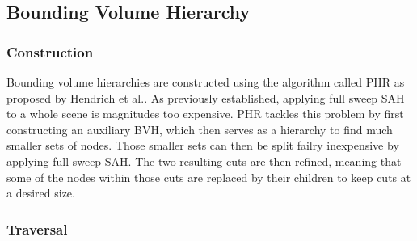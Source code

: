 \subsection{Bounding Volume Hierarchy}
\subsubsection{Construction}
Bounding volume hierarchies are constructed using the algorithm called PHR as proposed by Hendrich et al.\cite{hendrich_parallel_2017}. As previously established, applying full sweep SAH to a whole scene is magnitudes too expensive. PHR tackles this problem by first constructing an auxiliary BVH, which then serves as a hierarchy to find much smaller sets of nodes. Those smaller sets can then be split failry inexpensive by applying full sweep SAH. The two resulting cuts are then refined, meaning that some of the nodes within those cuts are replaced by their children to keep cuts at a desired size.



\subsubsection{Traversal}